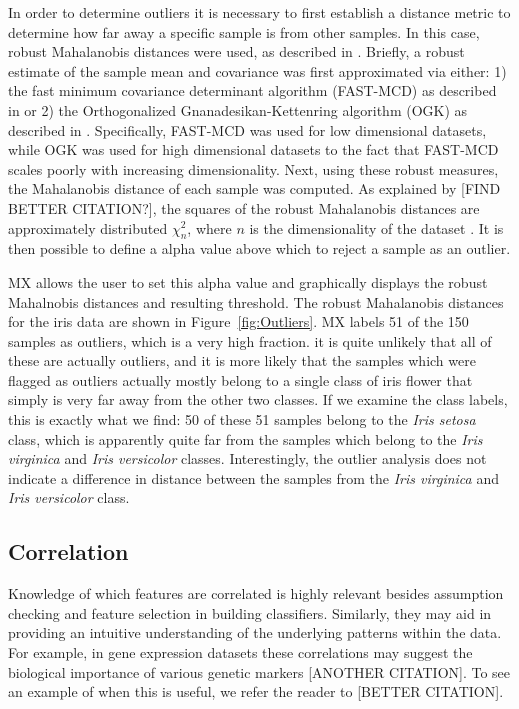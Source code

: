 \documentclass[12pt]{article}
\begin{document}
In order to determine outliers it is necessary to first establish a distance metric to determine how far away a specific sample is from other samples. In this case, robust Mahalanobis distances were used, as described in \cite{hubert2008high}. Briefly, a robust estimate of the sample mean and covariance was first approximated via either: 1) the fast minimum covariance determinant algorithm (FAST-MCD) as described in \cite{rousseeuw1999fast} or 2) the Orthogonalized Gnanadesikan-Kettenring algorithm (OGK) as described in \cite{maronna2002robust}. Specifically, FAST-MCD was used for low dimensional datasets, while OGK was used for high dimensional datasets to the fact that FAST-MCD scales poorly with increasing dimensionality. Next, using these robust measures, the Mahalanobis distance of each sample was computed. As explained by \cite{hardin2012distribution} [FIND BETTER CITATION?], the squares of the robust Mahalanobis distances are approximately distributed $\chi^2_n$, where $n$ is the dimensionality of the dataset . It is then possible to define a alpha value above which to reject a sample as an outlier. 

MX allows the user to set this alpha value and graphically displays the robust Mahalnobis distances and resulting threshold. The robust Mahalanobis distances for the iris data are shown in Figure~\ref{fig:Outliers}. MX labels 51 of the 150 samples as outliers, which is a very high fraction. it is quite unlikely that all of these are actually outliers, and it is more likely that the samples which were flagged as outliers actually mostly belong to a single class of iris flower that simply is very far away from the other two classes. If we examine the class labels, this is exactly what we find: 50 of these 51 samples belong to the \textit{Iris setosa} class, which is apparently quite far from the samples which belong to the \textit{Iris virginica} and \textit{Iris versicolor} classes. Interestingly, the outlier analysis does not indicate a difference in distance between the samples from the \textit{Iris virginica} and \textit{Iris versicolor} class. 

\subsection{Correlation}
\label{subsec:SubSecCorrelation}

Knowledge of which features are correlated is highly relevant besides assumption checking and feature selection in building classifiers. Similarly, they may aid in providing an intuitive understanding of the underlying patterns within the data. For example, in gene expression datasets these correlations may suggest the biological importance of various genetic markers [ANOTHER CITATION]. To see an example of when this is useful, we refer the reader to \cite{shi2012unsupervised} [BETTER CITATION].
\end{document}

